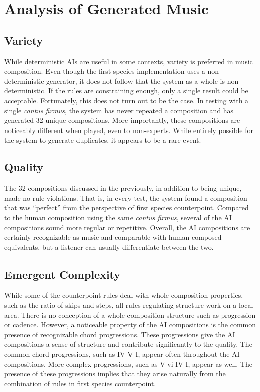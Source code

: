 \section{Analysis of Generated Music}

\subsection{Variety} 
While deterministic AIs are useful in some contexts, variety is preferred in music composition.
Even though the first species implementation uses a non-deterministic generator, it does not follow that the system as a whole is non-deterministic.
If the rules are constraining enough, only a single result could be acceptable.
Fortunately, this does not turn out to be the case.
In testing with a single \emph{cantus firmus}, the system has never repeated a composition and has generated 32 unique compositions.
More importantly, these compositions are noticeably different when played, even to non-experts.
While entirely possible for the system to generate duplicates, it appears to be a rare event.

\subsection{Quality} 
The 32 compositions discussed in the previously, in addition to being unique, made no rule violations.
That is, in every test, the system found a composition that was ``perfect'' from the perspective of first species counterpoint.
Compared to the human composition using the same \emph{cantus firmus}, several of the AI compositions sound more regular or repetitive.
Overall, the AI compositions are certainly recognizable as music and comparable with human composed equivalents, but a listener can usually differentiate between the two.

\subsection{Emergent Complexity} 
While some of the counterpoint rules deal with whole-composition properties, 
such as the ratio of skips and steps, all rules regulating structure work on a local area.
There is no conception of a whole-composition structure such as progression or cadence.
However, a noticeable property of the AI compositions is the common presence of recognizable chord progressions.
These progressions give the AI compositions a sense of structure and contribute significantly to the quality.
The common chord progressions, such as IV-V-I, appear often throughout the AI compositions.
More complex progressions, such as V-vi-IV-I, appear as well.
The presence of these progressions implies that they arise naturally from the combination of rules in first species counterpoint.

